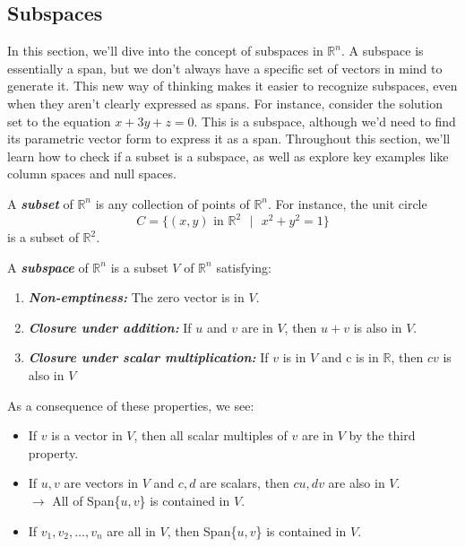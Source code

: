 \documentclass[a4paper,12pt]{article}
\begin{document}
\newpage

\subsection{Subspaces}\label{sec:subspaces}
In this section, we’ll dive into the concept of subspaces in \(\mathbb{R}^n\). A subspace is essentially a span, but we don’t always have a specific set of vectors in mind to generate it. This new way of thinking makes it easier to recognize subspaces, even when they aren’t clearly expressed as spans. For instance, consider the solution set to the equation \(x + 3y + z = 0\). This is a subspace, although we’d need to find its parametric vector form to express it as a span. Throughout this section, we’ll learn how to check if a subset is a subspace, as well as explore key examples like column spaces and null spaces.

\begin{tcolorbox}[title=Definition,colframe=blue!70!black, colback=blue!5!white]
A \textit{\textbf{subset}} of \(\mathbb{R}^n\) is any collection of points of \(\mathbb{R}^n\). For instance, the unit circle 
\[
C = \{(x, y) \text{ in \(\mathbb{R}^2\) } | \textbf{ }  x^2 + y^2 = 1\}
\]
is a subset of \(\mathbb{R}^2\).\\
\end{tcolorbox}

A \textbf{\textit{subspace}} of \(\mathbb{R}^n\) is a subset \(V\) of \(\mathbb{R}^n\) satisfying:
\begin{enumerate}
    \item \textbf{\textit{Non-emptiness:}} The zero vector is in \(V\).
    \item \textbf{\textit{Closure under addition:}} If \(u\) and \(v\) are in \(V\), then \(u+v\) is also in \(V\).
    \item \textbf{\textit{Closure under scalar multiplication:}} If \(v\) is in \(V\) and c is in $\mathbb{R}$, then \(cv\) is also in \(V\)
\end{enumerate}
As a consequence of these properties, we see:
\begin{itemize}
    \item If $v$ is a vector in $V$, then all scalar multiples of $v$ are in $V$ by the third property.
    \item If $u,v$ are vectors in $V$ and $c,d$ are scalars, then $cu, dv$ are also in $V$.\\
    $\rightarrow$ All of Span\{$u,v$\} is contained in $V$.
    \item If $v_1, v_2,\dots,v_n$ are all in $V$, then Span\{$u,v$\} is contained in $V$.
\end{itemize}
\end{document}
